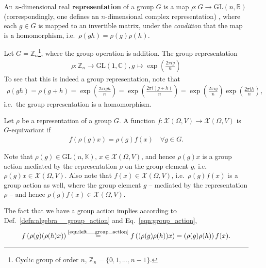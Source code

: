 \begin{defn}
	An $n$-dimensional real \textbf{representation} of a group $G$ is a map $\rho:G\rightarrow \text{GL}(n, \mathbb R)$ (correspondingly, one defines an $n$-dimensional complex representation) \cite[p.~15]{bronstein2021geometric}, where each $g\in G$ is mapped to an invertible matrix, under the \textit{condition} that the map is a homomorphism, i.e.~$\rho(gh) = \rho(g)\rho(h)$.
\end{defn}

\begin{exmp}
	Let $G = \mathbb Z_{n}$\footnote{Cyclic group of order $n$, $\mathbb Z_n = \{ 0, 1, \dots, n - 1 \}$.}, where the group operation is addition. The group representation 
	\begin{align}
		\rho: \mathbb Z_{n} \rightarrow \text{GL}(1, \mathbb C), g\mapsto \exp\left(\frac{2\pi ig}{n}\right)
	\end{align}
	To see that this is indeed a group representation, note that
	\begin{align}
		\rho(gh) = \rho(g + h) = \exp\left( \frac{2\pi igh}{n} \right) = \exp\left( \frac{2\pi i\left(g + h\right)}{n} \right) = \exp\left( \frac{2\pi ig}{n} \right)\exp\left( \frac{2\pi ih}{n} \right),
	\end{align}
	i.e.~the group representation is a homomorphism.
\end{exmp}

\begin{defn}[Equivariance]
	Let $\rho$ be a representation of a group $G$. A function $f:\mathcal X(\Omega, V) \rightarrow \mathcal X(\Omega, V)$ is $G$-equivariant if 
	\begin{align}\label{eqn:group_action}
		f(\rho(g)x) = \rho(g)f(x) \quad \forall g\in G.
	\end{align}
\end{defn}

\begin{remark}
	Note that $\rho(g)\in \text{GL}(n, \mathbb K)$, $x\in \mathcal X(\Omega, V)$, and hence $\rho(g)x$ is a group action mediated by the representation $\rho$ on the group element $g$, i.e.~$\rho(g)x\in \mathcal X(\Omega, V)$. Also note that $f(x)\in \mathcal X(\Omega, V)$, i.e.~$\rho(g)f(x)$ is a group action as well, where the group element $g$ -- mediated by the representation $\rho$ -- and hence $\rho(g)f(x) \in \mathcal X(\Omega, V)$.
	
	The fact that we have a group action implies according to Def.~\ref{defn:algebra__group_action} and Eq.~\eqref{eqn:group_action},
	\begin{align}
		f\left(\rho(g)(\rho(h)x)\right) \overset{\scriptsize \eqref{eqn:left__group_action}}{=} f\left( (\rho(g)\rho(h))x \right) = \left(\rho(g)\rho(h)\right)f(x).
	\end{align}
\end{remark}

